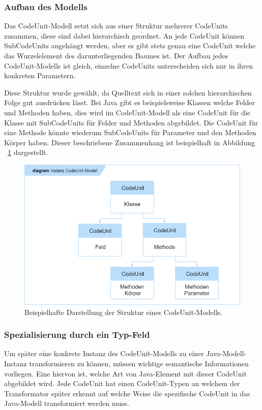 \documentclass[12pt,oneside,a4paper,parskip]{scrbook}
\begin{document}
\subsubsection{Aufbau des Modells}

Das CodeUnit-Modell setzt sich aus einer Struktur mehrerer CodeUnits zusammen, diese sind dabei hierarchisch geordnet. An jede CodeUnit können SubCodeUnits angehängt werden, aber es gibt stets genau eine CodeUnit welche das Wurzelelement des darunterliegenden Baumes ist. Der Aufbau jedes CodeUnit-Modells ist gleich, einzelne CodeUnits unterscheiden sich nur in ihren konkreten Parametern.

Diese Struktur wurde gewählt, da Quelltext sich in einer solchen hierarchischen Folge gut ausdrücken lässt. Bei Java gibt es beispielsweise Klassen welche Felder und Methoden haben, dies wird im CodeUnit-Modell als eine CodeUnit für die Klasse mit SubCodeUnits für Felder und Methoden abgebildet. Die CodeUnit für eine Methode könnte wiederum SubCodeUnits für Parameter und den Methoden Körper haben. Dieser beschriebene Zusammenhang ist beispielhaft in Abbildung ~\ref{fig:cu1} dargestellt.

\begin{figure}[htbp]
	\centering
	\includegraphics[width=1.0\textwidth]{bilder/cuModelBsp}
	\caption{Beispielhafte Darstellung der Struktur eines CodeUnit-Modells.}
	\label{fig:cu1}
\end{figure}

\subsubsection{Spezialisierung durch ein Typ-Feld}

Um später eine konkrete Instanz des CodeUnit-Modells zu einer Java-Modell-Instanz transformieren zu können, müssen wichtige semantische Informationen vorliegen. Eine hiervon ist, welche Art von Java-Element mit dieser CodeUnit abgebildet wird. Jede CodeUnit hat einen CodeUnit-Typen an welchem der Transformator später erkennt auf welche Weise die spezifische CodeUnit in das Java-Modell transformiert werden muss.
\end{document}

